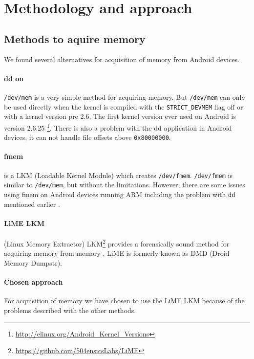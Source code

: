 \section{Methodology and approach}
\subsection{Methods to aquire memory}
We found several alternatives for acquisition of memory from Android devices.
\paragraph{dd on} \texttt{/dev/mem} is a very simple method for acquiring memory. But \texttt{/dev/mem} 
can only be used directly when the kernel is compiled with the \texttt{STRICT\_DEVMEM} flag off or with 
a kernel version pre 2.6. The first kernel version ever used on Android is version 2.6.25
\footnote{\url{http://elinux.org/Android\_Kernel\_Versions}}. There is also a problem with the dd 
application in Android devices, it can not handle file offsets above \texttt{0x80000000}\cite{acq_vol_android_mem}.
\paragraph{fmem} is a LKM (Loadable Kernel Module) which creates \texttt{/dev/fmem}. \texttt{/dev/fmem} 
is similar to \texttt{/dev/mem}, but without the limitations. However, there are some issues using 
fmem on Android devices running ARM including the problem with \texttt{dd} mentioned earlier \cite{acq_vol_android_mem}.
\paragraph{LiME LKM} (Linux Memory Extractor) LKM\footnote{\url{https://github.com/504ensicsLabs/LiME}} 
provides a forensically sound method for acquiring memory from memory \cite{heriyanto2013procedures}. 
LiME is formerly known as DMD (Droid Memory Dumpstr).
\paragraph{Chosen approach} For acquisition of memory we have chosen to use the LiME LKM because of 
the problems described with the other methods.
